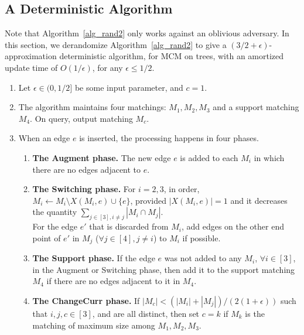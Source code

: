 \documentclass[11pt]{article}
\begin{document}
\subsection{A Deterministic Algorithm}
Note that Algorithm~\ref{alg_rand2} only works against an oblivious adversary. In this section, we derandomize Algorithm~\ref{alg_rand2} to give a $(3/2+\epsilon)$-approximation deterministic algorithm, for MCM on trees, with an amortized update time of $O(1/\epsilon)$, for any $\epsilon \leq 1/2$.


   \begin{algorithm}[H]
   \caption{Deterministic Algorithm for MCM}\label{alg_det1}
   \begin{enumerate}
    \item Let $\epsilon \in (0,1/2]$ be some input parameter, and $c=1$.
    \item The algorithm maintains four matchings: $M_1,M_2,M_3$ and a support matching $M_4$. On query, output matching $M_c$.
    \item When an edge $e$ is inserted, the processing happens in four phases.
   \begin{enumerate}
	   \item {\bf The Augment phase.} The new edge $e$
		   is added to each $M_i$ in which there are no 
		   edges  adjacent to $e$.
	   \item {\bf The Switching phase.}
		   For $i=2,3$, in order, $M_i\gets M_i\setminus X(M_i,e)\cup \{e\}$, provided $|X(M_i,e)|=1$ and it decreases the quantity 
 		   $\sum_{j\in[3],i\neq j}|M_i\cap M_j|$.\\
		   For the edge $e'$ that is discarded from $M_i$, add edges on the other end point of $e'$ in $M_j$ ($\forall j\in [4],j\neq i$) to $M_i$ if possible.
	    \item {\bf The Support phase.} If the edge $e$ was not added to any $M_i$, $\forall i\in[3]$, in the Augment or Switching phase, then add it to the support matching $M_4$ if there are no edges adjacent to it in $M_4$.
	    \item {\bf The ChangeCurr phase.} If $|M_c|< \left(|M_i|+|M_j|\right)/(2(1+\epsilon))$ such that $i,j,c\in[3]$, and are all distinct, then set $c = k$ if $M_k$ is the matching of maximum size among $M_1,M_2,M_3$.
   \end{enumerate}
   \end{enumerate}
 \end{algorithm}
\end{document}
